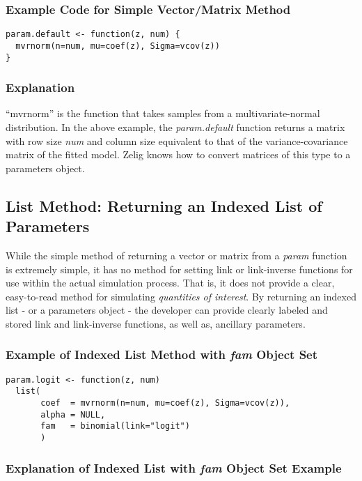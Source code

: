 \documentclass[11pt]{article}
\begin{document}
\subsubsection{Example Code for Simple Vector/Matrix Method}
\begin{verbatim}
param.default <- function(z, num) {
  mvrnorm(n=num, mu=coef(z), Sigma=vcov(z))
}
\end{verbatim}

\subsubsection{Explanation}
``mvrnorm'' is the function that takes samples from a multivariate-normal distribution.  In the above example, the \emph{param.default} function returns a matrix with row size \emph{num} and column size equivalent to that of the variance-covariance matrix of the fitted model.  Zelig knows how to convert matrices of this type to a parameters object.



\subsection{List Method: Returning an Indexed List of Parameters}

While the simple method of returning a vector or matrix from a \emph{param} function is extremely simple, it has no method for setting link or link-inverse functions for use within the actual simulation process.  That is, it does not provide a clear, easy-to-read method for simulating \emph{quantities of interest}.  By returning an indexed list - or a parameters object - the developer can provide clearly labeled and stored link and link-inverse functions, as well as, ancillary parameters.


\subsubsection{Example of Indexed List Method with \emph{fam} Object Set}

\begin{verbatim}
param.logit <- function(z, num)
  list(
       coef  = mvrnorm(n=num, mu=coef(z), Sigma=vcov(z)),
       alpha = NULL,
       fam   = binomial(link="logit")
       )
\end{verbatim}


\subsubsection{Explanation of Indexed List with \emph{fam} Object Set Example}
\end{document}
